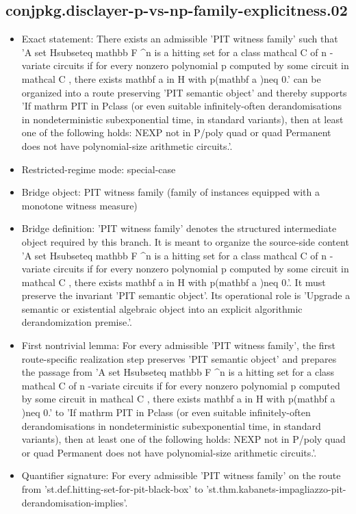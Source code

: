 \documentclass[11pt]{article}
\begin{document}
\subsection*{conjpkg.disclayer-p-vs-np-family-explicitness.02}
\begin{itemize}
\item Exact statement: There exists an admissible 'PIT witness family' such that 'A set Hsubseteq mathbb F \textasciicircum{}n is a hitting set for a class mathcal C of n -variate circuits if for every nonzero polynomial p computed by some circuit in mathcal C , there exists mathbf a in H with p(mathbf a )neq 0.' can be organized into a route preserving 'PIT semantic object' and thereby supports 'If mathrm PIT in Pclass (or even suitable infinitely-often derandomisations in nondeterministic subexponential time, in standard variants), then at least one of the following holds: NEXP not in P/poly quad or quad Permanent does not have polynomial-size arithmetic circuits.'.
\item Restricted-regime mode: special-case
\item Bridge object: PIT witness family (family of instances equipped with a monotone witness measure)
\item Bridge definition: 'PIT witness family' denotes the structured intermediate object required by this branch. It is meant to organize the source-side content 'A set Hsubseteq mathbb F \textasciicircum{}n is a hitting set for a class mathcal C of n -variate circuits if for every nonzero polynomial p computed by some circuit in mathcal C , there exists mathbf a in H with p(mathbf a )neq 0.'. It must preserve the invariant 'PIT semantic object'. Its operational role is 'Upgrade a semantic or existential algebraic object into an explicit algorithmic derandomization premise.'.
\item First nontrivial lemma: For every admissible 'PIT witness family', the first route-specific realization step preserves 'PIT semantic object' and prepares the passage from 'A set Hsubseteq mathbb F \textasciicircum{}n is a hitting set for a class mathcal C of n -variate circuits if for every nonzero polynomial p computed by some circuit in mathcal C , there exists mathbf a in H with p(mathbf a )neq 0.' to 'If mathrm PIT in Pclass (or even suitable infinitely-often derandomisations in nondeterministic subexponential time, in standard variants), then at least one of the following holds: NEXP not in P/poly quad or quad Permanent does not have polynomial-size arithmetic circuits.'.
\item Quantifier signature: For every admissible 'PIT witness family' on the route from 'st.def.hitting-set-for-pit-black-box' to 'st.thm.kabanets-impagliazzo-pit-derandomisation-implies'.

\end{itemize}
\end{document}
